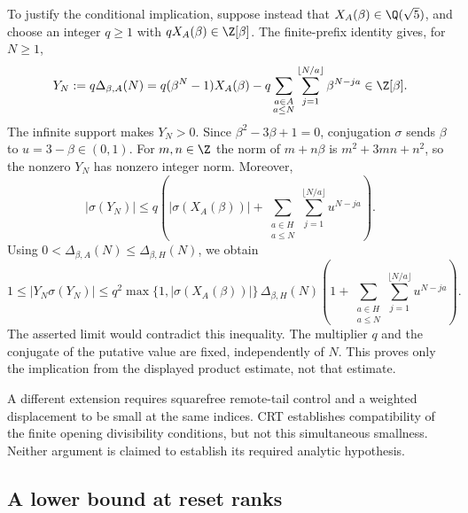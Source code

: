 To justify the conditional implication, suppose instead that
$X_A(\beta)\in\Q(\sqrt5)$, and choose an integer $q\ge1$ with
$qX_A(\beta)\in\Z[\beta]$.  The finite-prefix identity gives, for
$N\ge1$,
\[
 Y_N:=q\Delta_{\beta,A}(N)
 =q(\beta^N-1)X_A(\beta)
  -q\sum_{\substack{a\in A\\a\le N}}
           \sum_{j=1}^{\lfloor N/a\rfloor}\beta^{N-ja}
 \in\Z[\beta].
\]
The infinite support makes $Y_N>0$.  Since
$\beta^2-3\beta+1=0$, conjugation $\sigma$ sends $\beta$ to
$u=3-\beta\in(0,1)$.  For $m,n\in\Z$ the norm of $m+n\beta$
is $m^2+3mn+n^2$, so the nonzero $Y_N$ has nonzero integer norm.
Moreover,
\[
 |\sigma(Y_N)|\le q\left(|\sigma(X_A(\beta))|
       +\sum_{\substack{a\in H\\a\le N}}
             \sum_{j=1}^{\lfloor N/a\rfloor}u^{N-ja}\right).
\]
Using $0<\Delta_{\beta,A}(N)\le\Delta_{\beta,H}(N)$, we obtain
\[
 1\le |Y_N\sigma(Y_N)|
 \le q^2\max\{1,|\sigma(X_A(\beta))|\}\,
       \Delta_{\beta,H}(N)
       \left(1+\sum_{\substack{a\in H\\a\le N}}
                  \sum_{j=1}^{\lfloor N/a\rfloor}u^{N-ja}\right).
\]
The asserted limit would contradict this inequality.  The multiplier
$q$ and the conjugate of the putative value are fixed, independently
of $N$.  This proves only the implication from the displayed product
estimate, not that estimate.

A different extension requires squarefree remote-tail control and a
weighted displacement to be small at the same indices.  CRT establishes
compatibility of the finite opening divisibility conditions, but not this
simultaneous smallness.  Neither argument is claimed to establish its
required analytic hypothesis.


\subsection{A lower bound at reset ranks}
\label{ssec:route-1}

